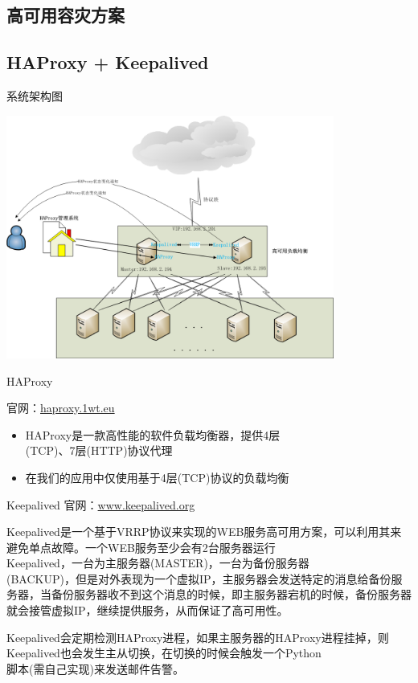 \documentclass[CJK]{beamer}
\begin{document}
\begin{CJK*}{UTF8}{gbsn}
\section{高可用容灾方案}

\subsection{HAProxy + Keepalived}

\begin{frame}{系统架构图}
\begin{center}
\includegraphics[height=8cm]{high-availability-load-balancer.png}
\end{center}
\end{frame}

\begin{frame}{HAProxy}

官网：\href{http://haproxy.1wt.eu/}{haproxy.1wt.eu}\\

\begin{itemize}
\item HAProxy是一款高性能的软件负载均衡器，提供4层\\(TCP)、7层(HTTP)协议代理
\item 在我们的应用中仅使用基于4层(TCP)协议的负载均衡
\end{itemize}
\end{frame}

\begin{frame}{Keepalived}
官网：\href{http://www.keepalived.org/}{www.keepalived.org}

\begin{block}{}
Keepalived是一个基于VRRP协议来实现的WEB服务高可用方案，可以利用其来避免单点故障。一个WEB服务至少会有2台服务器运行\\Keepalived，一台为主服务器(MASTER)，一台为备份服务器\\(BACKUP)，但是对外表现为一个虚拟IP，主服务器会发送特定的消息给备份服务器，当备份服务器收不到这个消息的时候，即主服务器宕机的时候，备份服务器就会接管虚拟IP，继续提供服务，从而保证了高可用性。
\end{block}
\begin{block}{}
Keepalived会定期检测HAProxy进程，如果主服务器的HAProxy进程挂掉，则Keepalived也会发生主从切换，在切换的时候会触发一个Python\\脚本(需自己实现)来发送邮件告警。
\end{block}
\end{frame}


\end{CJK*}
\end{document}

